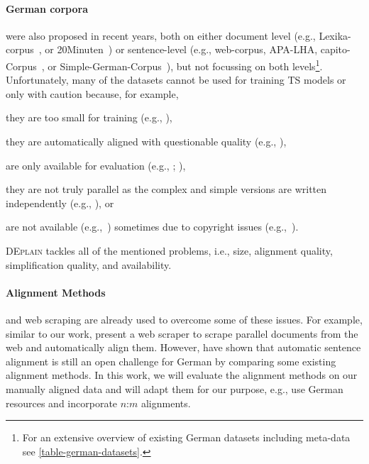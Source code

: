 \documentclass[11pt]{article}
\begin{document}
\paragraph{German corpora} were also proposed in recent years, both on either document level (e.g., Lexika-corpus~\citealt{hewett-stede-2021-automatically}, or 20Minuten~\citealt{rios-etal-2021-new}) or sentence-level (e.g., web-corpus, APA-LHA, capito-Corpus~\citealt{ebling-etal-2022-automatic}, or Simple-German-Corpus~\citealt{toborek-etal-2022-new}), but not focussing on both levels\footnote{For an extensive overview of existing German datasets including meta-data see \autoref{table-german-datasets}.}. Unfortunately, many of the datasets cannot be used for training TS models or only with caution because, for example, 
\begin{enumerate*}[label=\roman*)]
    \item they are too small for training (e.g., \citet{klaper-etal-2013-building}), 
    \item they are automatically aligned with questionable quality (e.g., \citealt{spring-etal-2021-exploring}), 
    \item are only available for evaluation (e.g., \citealt{mallinson-etal-2020-zero}; \citealt{naderi-etal-2019-subjective}),
    \item they are not truly parallel as the complex and simple versions are written independently (e.g., \citealt{aumiller-gertz-2022-klexikon}), or
    \item are not available (e.g.,~\citealt{ebling-etal-2022-automatic}) sometimes due to copyright issues (e.g.,~\citealt{battisti-etal-2020-corpus}). 
\end{enumerate*}
\textsc{DEplain} tackles  all of the mentioned problems, i.e., size, alignment quality, simplification quality, and availability.



\paragraph{Alignment Methods} and web scraping are already used to overcome some of these issues. For example, similar to our work, \citet{toborek-etal-2022-new} present a web scraper to scrape parallel  documents from the web and automatically align them. However, \cite{spring-etal-2022-ensembling} have shown that automatic sentence alignment is still an open challenge for German by comparing some existing alignment methods.
In this work, we will evaluate the alignment methods on our manually aligned data and will adapt them for our purpose, e.g., use German resources and incorporate $n$:$m$ alignments. \par 
\end{document}
